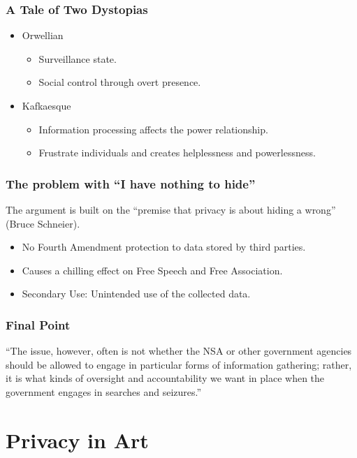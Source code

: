 \documentclass{beamer}
\begin{document}
\begin{frame}
\frametitle{A Tale of Two Dystopias}
\begin{itemize}
\item Orwellian
  \begin{itemize}
  \item Surveillance state.
  \item Social control through overt presence.
  \end{itemize}
\item Kafkaesque
  \begin{itemize}
  \item Information processing affects the power relationship.
  \item Frustrate individuals and creates helplessness and powerlessness.
  \end{itemize}
\end{itemize}

\end{frame}



\begin{frame}
\frametitle{The problem with ``I have nothing to hide''}

The argument is built on the ``premise that privacy is about hiding a
wrong'' (Bruce Schneier).

\begin{itemize}
\item No Fourth Amendment protection to data stored by third parties.
\item Causes a chilling effect on Free Speech and Free Association.
\item Secondary Use: Unintended use of the collected data.

\end{itemize}

\end{frame}

\begin{frame}
\frametitle{Final Point}

``The issue, however, often is not whether the NSA or other government
agencies should be allowed to engage in particular forms of information
gathering; rather, it is what kinds of oversight and accountability we
want in place when the government engages in searches and seizures.''


\end{frame}

\section{Privacy in Art}
\end{document}
